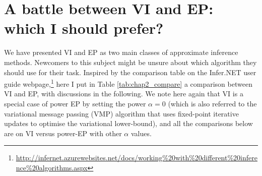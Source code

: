 \section{A battle between VI and EP: which I should prefer?}

We have presented VI and EP as two main classes of approximate inference methods. Newcomers to this subject might be unsure about which algorithm they should use for their task. Inspired by the comparison table on the Infer.NET \citep{microsoft:infernet2014} user guide webpage,\footnote{\url{http://infernet.azurewebsites.net/docs/working\%20with\%20different\%20inference\%20algorithms.aspx}} here I put in Table \ref{tab:chap2_compare} a comparison between VI and EP, with discussions in the following. We note here again that VI is a special case of power EP by setting the power $\alpha=0$ (which is also referred to the variational message passing (VMP) algorithm \citep{winn:vmp2005, minka:divergence2005} that uses fixed-point iterative updates to optimise the variational lower-bound), and all the comparisons below are on VI versus power-EP with other $\alpha$ values. 

